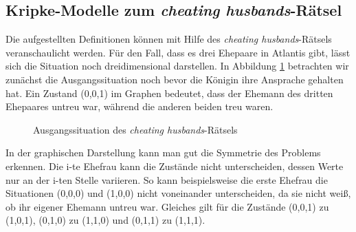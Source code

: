 \subsection{Kripke-Modelle zum \textit{cheating husbands}-Rätsel}
Die aufgestellten Definitionen können mit Hilfe des \textit{cheating husbands}-Rätsels veranschaulicht werden.
Für den Fall, dass es drei Ehepaare in Atlantis gibt, lässt sich die Situation noch dreidimensional darstellen.
In Abbildung \ref{ausgang} betrachten wir zunächst die Ausgangssituation noch bevor die Königin ihre Ansprache gehalten hat.
Ein Zustand (0,0,1) im Graphen bedeutet, dass der Ehemann des dritten Ehepaares untreu war, während die anderen beiden treu waren.

\begin{figure}
\centering
{}
\caption{Ausgangssituation des \textit{cheating husbands}-Rätsels}
\label{ausgang}
\end{figure}

In der graphischen Darstellung kann man gut die Symmetrie des Problems erkennen.
Die i-te Ehefrau kann die Zustände nicht unterscheiden, dessen Werte nur an der i-ten Stelle variieren.
So kann beispielsweise die erste Ehefrau die Situationen (0,0,0) und (1,0,0) nicht voneinander unterscheiden, da sie nicht weiß, ob ihr eigener Ehemann untreu war. Gleiches gilt für die Zustände (0,0,1) zu (1,0,1), (0,1,0) zu (1,1,0) und (0,1,1) zu (1,1,1).

